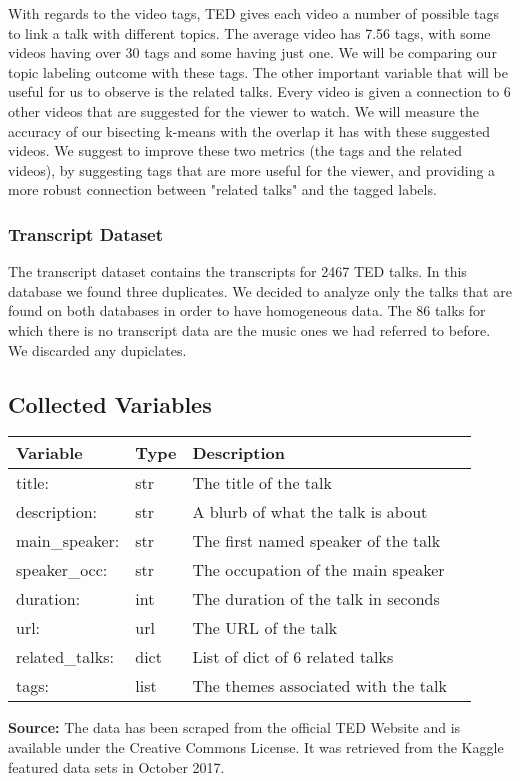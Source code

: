 \documentclass[letterpaper, 11pt]{article}
\begin{document}
With regards to the video tags, TED gives each video a number of
possible tags to link a talk with different topics. The average video
has 7.56 tags, with some videos having over 30 tags and some having just
one. We will be comparing our topic labeling outcome with these tags. The other important variable that will be useful for us to observe
is the related talks. Every video is given a connection to 6 other
videos that are suggested for the viewer to watch. We will measure the accuracy of our bisecting k-means with the overlap it has with these suggested videos. We suggest to improve these two metrics (the tags and the related videos), by suggesting tags that are more useful for
the viewer, and providing a more robust connection between "related talks" and the tagged labels.

    \subsubsection{Transcript Dataset}\label{transcript-dataset}

The transcript dataset contains the transcripts for 2467 TED talks. In
this database we found three duplicates. We decided to analyze only the
talks that are found on both databases in order to have homogeneous
data. The 86 talks for which there is no transcript data are the music
ones we had referred to before. We discarded any dupiclates.

\subsection{Collected Variables}\label{collected-variables}
\begin{minipage}{\linewidth}
\centering
{} \label{tab:title}
\begin{tabular}{llll}
\toprule
Variable &                Type &     Description  \\
\midrule
title: &         str &                    The title of the talk \\
description: &         str &        A blurb of what the talk is about \\
main\_speaker: &         str &      The first named speaker of the talk \\
speaker\_occ: &         str &       The occupation of the main speaker \\
duration: &         int &      The duration of the talk in seconds \\
url: &         url &                      The URL of the talk \\
related\_talks: &        dict &          List of dict of 6 related talks \\
tags: &        list &      The themes associated with the talk \\
\bottomrule
\end{tabular}\par
\medskip
\captionsetup{width=10.6cm, font=footnotesize}
\caption*{\textbf{Source:} The data has been scraped from the official TED Website and is available
under the Creative Commons License. It was retrieved from the Kaggle
featured data sets in October 2017.}
\end{minipage}
\end{document}
